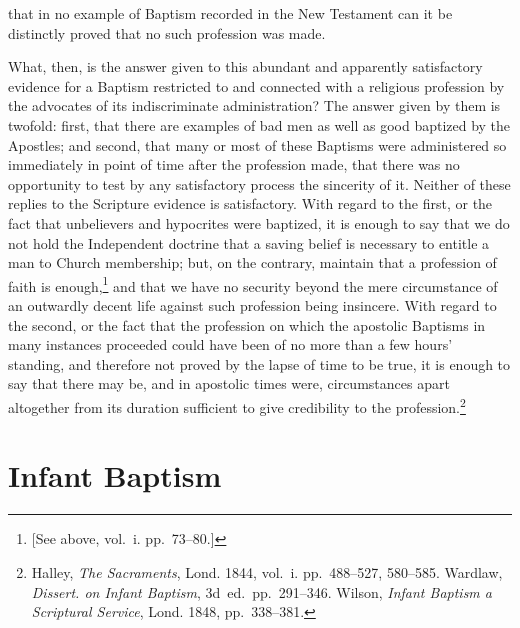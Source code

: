 \documentclass[
  english,
]{book}
\begin{document}
that in no example of Baptism recorded in the New Testament can it be distinctly proved that no such profession was made.

What, then, is the answer given to this abundant and apparently satisfactory evidence for a Baptism restricted to and connected with a religious profession by the advocates of its indiscriminate administration? The answer given by them is twofold: first, that there are examples of bad men as well as good baptized by the Apostles; and second, that many or most of these Baptisms were administered so immediately in point of time after the profession made, that there was no opportunity to test by any satisfactory process the sincerity of it. Neither of these replies to the Scripture evidence is satisfactory. With regard to the first, or the fact that unbelievers and hypocrites were baptized, it is enough to say that we do not hold the Independent doctrine that a saving belief is necessary to entitle a man to Church membership; but, on the contrary, maintain that a profession of faith is enough,\footnote{{[}See above, vol.~i. pp.~73--80.{]}} and that we have no security beyond the mere circumstance of an outwardly decent life against such profession being insincere. With regard to the second, or the fact that the profession on which the apostolic Baptisms in many instances proceeded could have been of no more than a few hours' standing, and therefore not proved by the lapse of time to be true, it is enough to say that there may be, and in apostolic times were, circumstances apart altogether from its duration sufficient to give credibility to the profession.\footnote{Halley, \emph{The Sacraments}, Lond. 1844, vol.~i. pp.~488--527, 580--585. Wardlaw, \emph{Dissert. on Infant Baptism}, 3d~ed.~pp.~291--346. Wilson, \emph{Infant Baptism a Scriptural Service}, Lond. 1848, pp.~338--381.}

\hypertarget{infant-baptism}{%
\section{Infant Baptism}\label{infant-baptism}}
\end{document}
